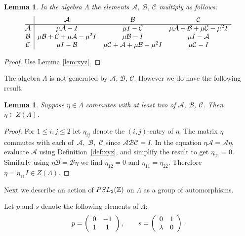 \documentclass[10pt,a4paper]{amsart}
\numberwithin{equation}{section}
\newtheorem{Lemma}[Theorem]{Lemma}
\begin{document}
\begin{Lemma}
\label{lem:multtable2}
In the algebra $\Lambda $ the elements $\mathcal A$, $\mathcal B$, $\mathcal C$
multiply as follows:
\[
\begin{array}{@{}c| c c c}
 &  \mathcal A & \mathcal B  & \mathcal C \\
\hline
\mathcal A &   \mu \mathcal A  - I &   \mu I - \mathcal C
&  \mu \mathcal A  + \mathcal B + \mu \mathcal C  -\mu^2 I \\
\mathcal B
&
\mu \mathcal B + \mathcal C + \mu \mathcal A  -\mu^2 I
&
  \mu \mathcal B - I
&
 \mu I- \mathcal A
\\
\mathcal C
&
 \mu I - \mathcal B
&
\mu \mathcal C  + \mathcal A + \mu \mathcal B  -\mu^2 I
&
\mu \mathcal C - I
\end{array}
\]
\end{Lemma}

\begin{proof}
Use Lemma
\ref{lem:xyz}.
\end{proof}




 The algebra $\Lambda $ is not generated by
$\mathcal A$, $\mathcal B$, $\mathcal C$. However
we do have the following result.

\begin{Lemma}
\label{lem:whatittakes}
Suppose  $\eta  \in \Lambda $ commutes with at
 least two of
$\mathcal A$, $\mathcal B$, $\mathcal C$.
Then $\eta  \in Z(\Lambda )$.
\end{Lemma}

\begin{proof}
For $1 \leq i,j\leq 2$
let $\eta_{ij}$ denote the $(i,j)$-entry of $\eta$.
The matrix $\eta $ commutes with each of~$\mathcal A$,~$\mathcal B$,~$\mathcal C$
since $\mathcal A\mathcal B\mathcal C=I$.
In the equation $\eta \mathcal A=\mathcal A \eta  $,
evaluate $\mathcal A$ using Def\/inition~\ref{def:xyz}, and simplify the result to get
$\eta_{21}=0$. Similarly using $\eta \mathcal B=\mathcal B\eta $
we f\/ind $\eta_{12}=0$ and
$\eta_{11}=\eta_{22}$.
Therefore $\eta =\eta_{11} I\in Z(\Lambda )$.
\end{proof}


  Next we describe an
action of ${\rm  {PSL}}_2(\mathbb Z)$ on $\Lambda $ as
a group of automorphisms.

\begin{Definition}
\label{def:ps}
Let $p$ and $s$ denote the following elements
of $\Lambda $:
\begin{gather*}
p =
\left(
\begin{array}{  c c}
0 & -1   \\
1 & 1
\end{array}
\right),
\qquad
s =
\left(
\begin{array}{  c c}
0 &  1 \\
\lambda  & 0
\end{array}
\right).
\end{gather*}
\end{Definition}
\end{document}
